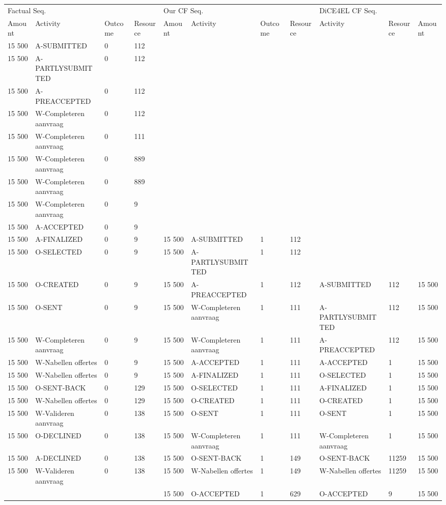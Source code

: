 \begin{tabular}{lllllllllll}
\toprule
\multicolumn{4}{l}{Factual Seq.} & \multicolumn{4}{l}{Our CF Seq.} & \multicolumn{3}{l}{DiCE4EL CF Seq.} \\
Amount & Activity & Outcome & Resource & Amount & Activity & Outcome & Resource & Activity & Resource & Amount \\
\midrule
15 500 & A-SUBMITTED & 0 & 112 &  &  &  &  &  &  &  \\
15 500 & A-PARTLYSUBMITTED & 0 & 112 &  &  &  &  &  &  &  \\
15 500 & A-PREACCEPTED & 0 & 112 &  &  &  &  &  &  &  \\
15 500 & W-Completeren aanvraag & 0 & 112 &  &  &  &  &  &  &  \\
15 500 & W-Completeren aanvraag & 0 & 111 &  &  &  &  &  &  &  \\
15 500 & W-Completeren aanvraag & 0 & 889 &  &  &  &  &  &  &  \\
15 500 & W-Completeren aanvraag & 0 & 889 &  &  &  &  &  &  &  \\
15 500 & W-Completeren aanvraag & 0 & 9 &  &  &  &  &  &  &  \\
15 500 & A-ACCEPTED & 0 & 9 &  &  &  &  &  &  &  \\
15 500 & A-FINALIZED & 0 & 9 & 15 500 & A-SUBMITTED & 1 & 112 &  &  &  \\
15 500 & O-SELECTED & 0 & 9 & 15 500 & A-PARTLYSUBMITTED & 1 & 112 &  &  &  \\
15 500 & O-CREATED & 0 & 9 & 15 500 & A-PREACCEPTED & 1 & 112 & A-SUBMITTED & 112 & 15 500 \\
15 500 & O-SENT & 0 & 9 & 15 500 & W-Completeren aanvraag & 1 & 111 & A-PARTLYSUBMITTED & 112 & 15 500 \\
15 500 & W-Completeren aanvraag & 0 & 9 & 15 500 & W-Completeren aanvraag & 1 & 111 & A-PREACCEPTED & 112 & 15 500 \\
15 500 & W-Nabellen offertes & 0 & 9 & 15 500 & A-ACCEPTED & 1 & 111 & A-ACCEPTED & 1 & 15 500 \\
15 500 & W-Nabellen offertes & 0 & 9 & 15 500 & A-FINALIZED & 1 & 111 & O-SELECTED & 1 & 15 500 \\
15 500 & O-SENT-BACK & 0 & 129 & 15 500 & O-SELECTED & 1 & 111 & A-FINALIZED & 1 & 15 500 \\
15 500 & W-Nabellen offertes & 0 & 129 & 15 500 & O-CREATED & 1 & 111 & O-CREATED & 1 & 15 500 \\
15 500 & W-Valideren aanvraag & 0 & 138 & 15 500 & O-SENT & 1 & 111 & O-SENT & 1 & 15 500 \\
15 500 & O-DECLINED & 0 & 138 & 15 500 & W-Completeren aanvraag & 1 & 111 & W-Completeren aanvraag & 1 & 15 500 \\
15 500 & A-DECLINED & 0 & 138 & 15 500 & O-SENT-BACK & 1 & 149 & O-SENT-BACK & 11259 & 15 500 \\
15 500 & W-Valideren aanvraag & 0 & 138 & 15 500 & W-Nabellen offertes & 1 & 149 & W-Nabellen offertes & 11259 & 15 500 \\
 &  &  &  & 15 500 & O-ACCEPTED & 1 & 629 & O-ACCEPTED & 9 & 15 500 \\
\bottomrule
\end{tabular}
